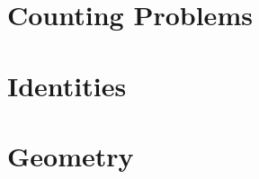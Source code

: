 \documentclass[10pt, twocolumn]{article}
\begin{document}
\section{Counting Problems}

\section{Identities}

\section{Geometry}








\end{document}
